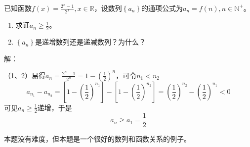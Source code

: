 ~

\begin{example}
已知函数$f\left( x \right) =\frac{2^x-1}{2^x},x\in \mathbb{R} $，设数列$\left\{ a_n \right\} $的通项公式为$a_n=f\left( n \right) ,n\in \mathbb{N} ^+$。
\begin{enumerate}
    \item 求证$a_n\geqslant \frac{1}{2}$。
    \item $\left\{ a_n \right\} $是递增数列还是递减数列？为什么？
\end{enumerate}
\end{example}

解：

（1、2）易得$a_n=\frac{2^n-1}{2^n}=1-\left( \frac{1}{2} \right) ^n$，可令$n_1<n_2$
\[
a_{n_1}-a_{n_2}=\left[ 1-\left( \frac{1}{2} \right) ^{n_1} \right] -\left[ 1-\left( \frac{1}{2} \right) ^{n_2} \right] =\left( \frac{1}{2} \right) ^{n_2}-\left( \frac{1}{2} \right) ^{n_1}<0
\]
可见$a_n\geqslant \frac{1}{2}$递增，于是
\[
a_n\geqslant a_1=\frac{1}{2}
\]

\begin{tcolorbox}
本题没有难度，但本题是一个很好的数列和函数关系的例子。
\end{tcolorbox}




